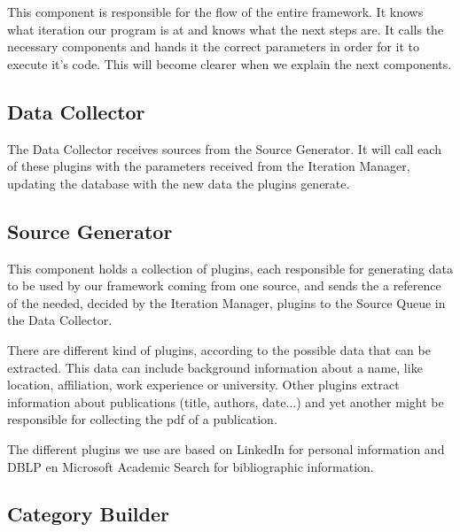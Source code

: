 This component is responsible for the flow of the entire framework. It knows what iteration our program is at and knows what the next steps are. It calls the necessary components and hands it the correct parameters in order for it to execute it's code. This will become clearer when we explain the next components.

\subsection{Data Collector}

The Data Collector receives sources from the Source Generator. It will call each of these plugins with the parameters received from the Iteration Manager, updating the database with the new data the plugins generate.

\subsection{Source Generator}

This component holds a collection of plugins, each responsible for generating data to be used by our framework coming from one source, and sends the a reference of the needed, decided by the Iteration Manager, plugins to the Source Queue in the Data Collector. 

There are different kind of plugins, according to the possible data that can be extracted. This data can include background information about a name, like location, affiliation, work experience or university. Other plugins extract information about publications (title, authors, date...) and yet another might be responsible for collecting the pdf of a publication.


The different plugins we use are based on LinkedIn for personal information and DBLP en Microsoft Academic Search for bibliographic information.


\subsection{Category Builder}
\label{categorybuilder}

